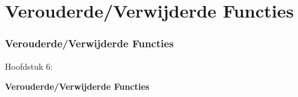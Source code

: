%

\section{Verouderde/Verwijderde Functies}
\begin{frame}[fragile]
	\frametitle{Verouderde/Verwijderde Functies}

	\begin{center}\huge{Hoofdstuk 6:}\end{center}
	\begin{center}\huge{\color{typo3darkgrey}\textbf{Verouderde/Verwijderde Functies}}\end{center}

\end{frame}


